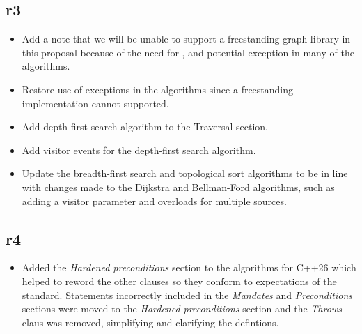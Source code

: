 \subsection*{\paperno r3}
\begin{itemize}
      \item Add a note that we will be unable to support a freestanding graph library in this proposal because
            of the need for ,  and potential  exception in many of 
            the algorithms. 
      \item Restore use of exceptions in the algorithms since a freestanding implementation cannot supported.
      \item Add depth-first search algorithm to the Traversal section.
      \item Add visitor events for the depth-first search algorithm.
      \item Update the breadth-first search and topological sort algorithms to be in line with changes made to the 
            Dijkstra and Bellman-Ford algorithms, such as adding a visitor parameter and overloads for multiple sources.
\end{itemize}

\subsection*{\paperno r4}
\begin{itemize}
      \item Added the \textit{Hardened preconditions} section to the algorithms for C++26 which helped to reword
            the other clauses so they conform to expectations of the standard. Statements incorrectly included in 
            the \textit{Mandates} and \textit{Preconditions} sections were moved to the \textit{Hardened preconditions} 
            section and the \textit{Throws} claus was removed, simplifying and clarifying the defintions.
\end{itemize}
